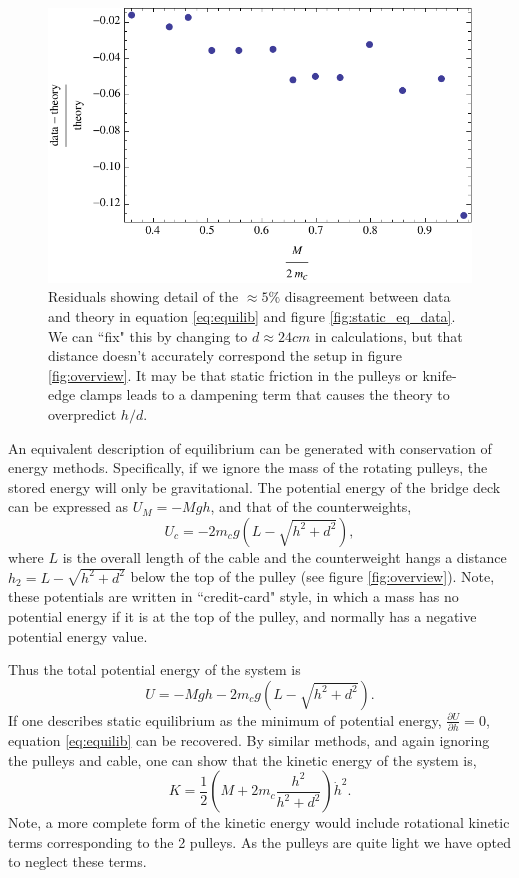 \documentclass[12pt]{iopart}
\newcommand{\be}{\begin{equation}}
\newcommand{\ee}{\end{equation}}
\begin{document}
\begin{figure}[h!]
\centering
\includegraphics[width=\columnwidth]{static_residuals.pdf}  
\caption{
Residuals showing detail of the $\approx 5\%$ disagreement between data and theory in equation \ref{eq:equilib} and figure \ref{fig:static_eq_data}.  We can ``fix" this by changing to $d \approx 24cm$ in calculations, but that distance doesn't accurately correspond the setup in figure \ref{fig:overview}.  It may be that static friction in the pulleys or knife-edge clamps leads to a dampening term that causes the theory to overpredict $h/d$. 
}
\label{fig:static_eq_residuals_data}
\end{figure} 
 
An equivalent description of equilibrium can be generated with conservation of energy methods.  Specifically, if we ignore the mass of the rotating pulleys, the stored energy will only be gravitational.  The potential energy of the bridge deck can be expressed as $U_M=-M g h$, and that of the counterweights,
\be
U_c=-2 m_c g \left(L-\sqrt{h^2+d^2}\right),
\nonumber
\ee 
where $L$ is the overall length of the cable and the counterweight hangs a distance  $h_2=L-\sqrt{h^2+d^2}$ below the top of the pulley (see figure \ref{fig:overview}).  Note, these potentials are written in ``credit-card" style, in which a mass has no potential energy if it is at the top of the pulley, and normally has a negative potential energy value.

Thus the total potential energy of the system is 
\be
U=-M g h - 2 m_c g \left(L-\sqrt{h^2+d^2}\right).
\ee
If one describes static equilibrium as the minimum of potential energy, $\frac{\partial U}{\partial h}=0$, equation \ref{eq:equilib} can be recovered.  By similar methods, and again ignoring the pulleys and cable, one can show that the kinetic energy of the system is,
\be
K=\frac{1}{2}\left( M  +  2m_c  \frac{h^2}{h^2+d^2} \right) \dot{h}^2.
\ee
Note, a more complete form of the kinetic energy would include rotational kinetic terms corresponding to the 2 pulleys.  As the pulleys are quite light we have opted to neglect these terms.
\end{document}
